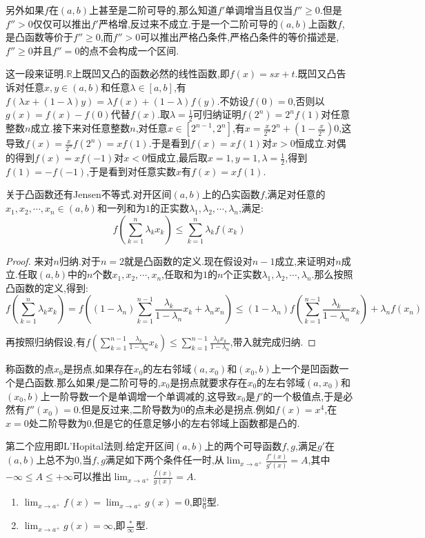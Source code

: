 另外如果$f$在$(a,b)$上甚至是二阶可导的,那么知道$f'$单调增当且仅当$f''\ge0$.但是$f''>0$仅仅可以推出$f'$严格增,反过来不成立.于是一个二阶可导的$(a,b)$上函数$f$,是凸函数等价于$f''\ge0$,而$f''>0$可以推出严格凸条件,严格凸条件的等价描述是,$f''\ge0$并且$f''=0$的点不会构成一个区间.

这一段来证明.$\mathbb{R}$上既凹又凸的函数必然的线性函数,即$f(x)=sx+t$.既凹又凸告诉对任意$x,y\in(a,b)$和任意$\lambda\in[a,b]$,有$f(\lambda x+(1-\lambda)y)=\lambda f(x)+(1-\lambda)f(y)$.不妨设$f(0)=0$,否则以$g(x)=f(x)-f(0)$代替$f(x)$.取$\lambda=\frac{1}{2}$可归纳证明$f(2^n)=2^nf(1)$对任意整数$n$成立.接下来对任意整数$n$,对任意$x\in[2^{n-1},2^n]$,有$x=\frac{x}{2^n}2^n+(1-\frac{x}{2^n})0$,这导致$f(x)=\frac{x}{2^n}f(2^n)=xf(1)$.于是看到$f(x)=xf(1)$对$x>0$恒成立.对偶的得到$f(x)=xf(-1)$对$x<0$恒成立,最后取$x=1,y=1,\lambda=\frac{1}{2}$,得到$f(1)=-f(-1)$,于是看到对任意实数$x$有$f(x)=xf(1)$.

关于凸函数还有Jensen不等式.对开区间$(a,b)$上的凸实函数$f$,满足对任意的$x_1,x_2,\cdots,x_n\in (a,b)$和一列和为$1$的正实数$\lambda_1,\lambda_2,\cdots,\lambda_n$,满足:
$$f(\sum_{k=1}^{n}\lambda_kx_k)\le\sum_{k=1}^{n}\lambda_kf(x_k)$$
\begin{proof}
	
	来对$n$归纳.对于$n=2$就是凸函数的定义.现在假设对$n-1$成立,来证明对$n$成立.任取$(a,b)$中的$n$个数$x_1,x_2,\cdots,x_n$,任取和为$1$的$n$个正实数$\lambda_1,\lambda_2,\cdots,\lambda_n$.那么按照凸函数的定义,得到:$$f(\sum_{k=1}^{n}\lambda_kx_k)=f((1-\lambda_n)\sum_{k=1}^{n-1}\frac{\lambda_k}{1-\lambda_n}x_k+\lambda_nx_n)
	\le(1-\lambda_n)f(\sum_{k=1}^{n-1}\frac{\lambda_k}{1-\lambda_n}x_k)+\lambda_nf(x_n)$$
	
	再按照归纳假设,有$f(\sum_{k=1}^{n-1}\frac{\lambda_k}{1-\lambda_n}x_k)\le\sum_{k=1}^{n-1}\frac{\lambda_kx_k}{1-\lambda_n}$,带入就完成归纳.
	
\end{proof}

称函数的点$x_0$是拐点,如果存在$x_0$的左右邻域$(a,x_0)$和$(x_0,b)$上一个是凹函数一个是凸函数.那么如果$f$是二阶可导的,$x_0$是拐点就要求存在$x_0$的左右邻域$(a,x_0)$和$(x_0,b)$上一阶导数一个是单调增一个单调减的,这导致$x_0$是$f'$的一个极值点,于是必然有$f''(x_0)=0$.但是反过来,二阶导数为0的点未必是拐点.例如$f(x)=x^4$,在$x=0$处二阶导数为0,但是它的任意足够小的左右邻域上函数都是凸的.

第二个应用即L'Hopital法则.给定开区间$(a,b)$上的两个可导函数$f,g$,满足$g'$在$(a,b)$上总不为0,当$f,g$满足如下两个条件任一时,从$\lim_{x\to a^+}\frac{f'(x)}{g'(x)}=A$,其中$-\infty\le A\le+\infty$可以推出$\lim_{x\to a^+}\frac{f(x)}{g(x)}=A$.
\begin{enumerate}
	\item $\lim_{x\to a^+}f(x)=\lim_{x\to a^+}g(x)=0$,即$\frac{0}{0}$型.
	\item $\lim_{x\to a^+}g(x)=\infty$,即$\frac{*}{\infty}$型.
\end{enumerate}

